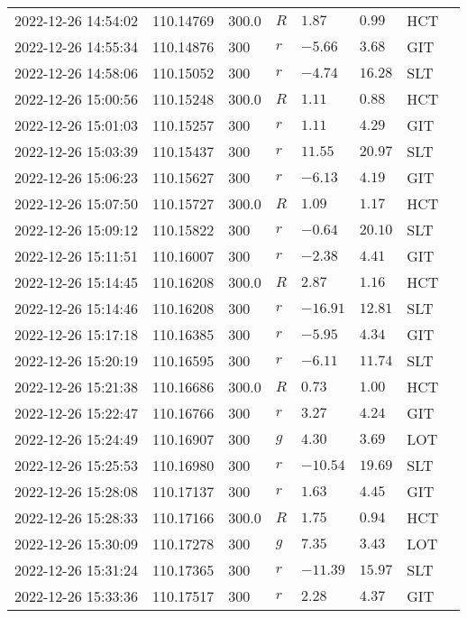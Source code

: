 \documentclass{nature_plusfigure}
\begin{document}
\begin{supplement}
\begin{center}
\begin{longtable}{llllllll}
2022-12-26 14:54:02 & 110.14769 & 300.0 & $R$ & $1.87$ & $0.99$ & HCT &  \\ 
2022-12-26 14:55:34 & 110.14876 & 300 & $r$ & $-5.66$ & $3.68$ & GIT &  \\ 
2022-12-26 14:58:06 & 110.15052 & 300 & $r$ & $-4.74$ & $16.28$ & SLT &  \\ 
2022-12-26 15:00:56 & 110.15248 & 300.0 & $R$ & $1.11$ & $0.88$ & HCT &  \\ 
2022-12-26 15:01:03 & 110.15257 & 300 & $r$ & $1.11$ & $4.29$ & GIT &  \\ 
2022-12-26 15:03:39 & 110.15437 & 300 & $r$ & $11.55$ & $20.97$ & SLT &  \\ 
2022-12-26 15:06:23 & 110.15627 & 300 & $r$ & $-6.13$ & $4.19$ & GIT &  \\ 
2022-12-26 15:07:50 & 110.15727 & 300.0 & $R$ & $1.09$ & $1.17$ & HCT &  \\ 
2022-12-26 15:09:12 & 110.15822 & 300 & $r$ & $-0.64$ & $20.10$ & SLT &  \\ 
2022-12-26 15:11:51 & 110.16007 & 300 & $r$ & $-2.38$ & $4.41$ & GIT &  \\ 
2022-12-26 15:14:45 & 110.16208 & 300.0 & $R$ & $2.87$ & $1.16$ & HCT &  \\ 
2022-12-26 15:14:46 & 110.16208 & 300 & $r$ & $-16.91$ & $12.81$ & SLT &  \\ 
2022-12-26 15:17:18 & 110.16385 & 300 & $r$ & $-5.95$ & $4.34$ & GIT &  \\ 
2022-12-26 15:20:19 & 110.16595 & 300 & $r$ & $-6.11$ & $11.74$ & SLT &  \\ 
2022-12-26 15:21:38 & 110.16686 & 300.0 & $R$ & $0.73$ & $1.00$ & HCT &  \\ 
2022-12-26 15:22:47 & 110.16766 & 300 & $r$ & $3.27$ & $4.24$ & GIT &  \\ 
2022-12-26 15:24:49 & 110.16907 & 300 & $g$ & $4.30$ & $3.69$ & LOT &  \\ 
2022-12-26 15:25:53 & 110.16980 & 300 & $r$ & $-10.54$ & $19.69$ & SLT &  \\ 
2022-12-26 15:28:08 & 110.17137 & 300 & $r$ & $1.63$ & $4.45$ & GIT &  \\ 
2022-12-26 15:28:33 & 110.17166 & 300.0 & $R$ & $1.75$ & $0.94$ & HCT &  \\ 
2022-12-26 15:30:09 & 110.17278 & 300 & $g$ & $7.35$ & $3.43$ & LOT &  \\ 
2022-12-26 15:31:24 & 110.17365 & 300 & $r$ & $-11.39$ & $15.97$ & SLT &  \\ 
2022-12-26 15:33:36 & 110.17517 & 300 & $r$ & $2.28$ & $4.37$ & GIT &  \\ 

\end{longtable}
\end{center}
\end{supplement}
\end{document}
